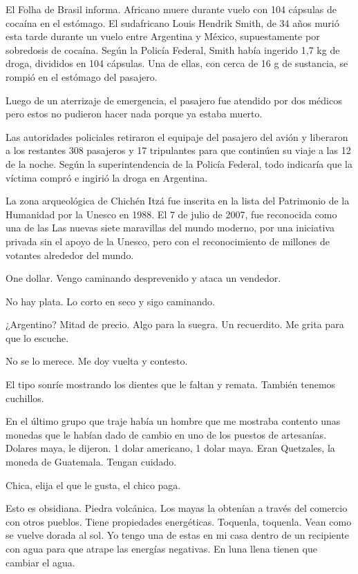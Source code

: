 \documentclass[11pt,twoside,openright,a6paper]{book}
\begin{document}
\vspace{1.5cm}
El Folha de Brasil informa. Africano muere durante vuelo con 104 cápsulas de cocaína en el estómago.  El sudafricano Louis Hendrik Smith, de 34 años murió esta tarde durante un vuelo entre Argentina y México, supuestamente por sobredosis de cocaína.
Según la Policía Federal, Smith había ingerido 1,7 kg de droga, divididos en 104 cápsulas. Una de ellas, con cerca de 16 g de sustancia, se rompió en el estómago del pasajero.

Luego de un aterrizaje de emergencia, el pasajero fue atendido por dos médicos pero estos no pudieron hacer nada porque ya estaba muerto.

Las autoridades policiales retiraron el equipaje del pasajero del avión y liberaron a los restantes 308 pasajeros y 17 tripulantes para que continúen su viaje a las 12 de la noche.
Según la superintendencia de la Policía Federal, todo indicaría que la víctima compró e ingirió la droga en Argentina.


\vspace{1.5cm}
La zona arqueológica de Chichén Itzá fue inscrita en la lista del Patrimonio de la Humanidad por la Unesco en 1988. El 7 de julio de 2007, fue reconocida como una de las Las nuevas siete maravillas del mundo moderno, por una iniciativa privada sin el apoyo de la Unesco, pero con el reconocimiento de millones de votantes alrededor del mundo.


\vspace{1.5cm}
One dollar. Vengo caminando desprevenido y ataca un vendedor.

No hay plata. Lo corto en seco y sigo caminando.

¿Argentino? Mitad de precio. Algo para la suegra. Un recuerdito. Me grita para que lo escuche.

No se lo merece. Me doy vuelta y contesto.

El tipo sonríe mostrando los dientes que le faltan y remata. También tenemos cuchillos.


\vspace{1.5cm}
En el último grupo que traje había un hombre que me mostraba contento unas monedas que le habían dado de cambio en uno de los puestos de artesanías. Dolares maya, le dijeron. 1 dolar americano, 1 dolar maya. Eran Quetzales, la moneda de Guatemala. Tengan cuidado.


\vspace{1.5cm}
Chica, elija el que le gusta, el chico paga.


\vspace{1.5cm}
Esto es obsidiana. Piedra volcánica. Los mayas la obtenían a través del comercio con otros pueblos. Tiene propiedades energéticas. Toquenla, toquenla. Vean como se vuelve dorada al sol. Yo tengo una de estas en mi casa dentro de un recipiente con agua para que atrape las energías negativas. En luna llena tienen que cambiar el agua.
\end{document}
